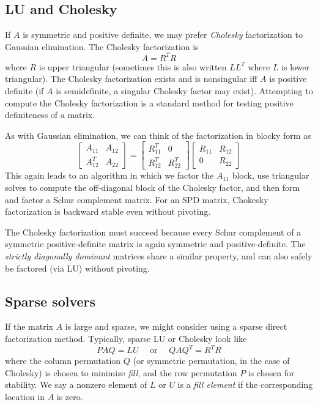 \documentclass[12pt, leqno]{article}
\begin{document}
\subsection{LU and Cholesky}

If $A$ is symmetric and positive definite, we may prefer {\em
  Cholesky} factorization to Gaussian elimination.  The Cholesky
factorization is
\[
  A = R^T R
\]
where $R$ is upper triangular (sometimes this is also written $LL^T$
where $L$ is lower triangular).  The Cholesky factorization exists
and is nonsingular iff $A$ is positive definite (if $A$ is
semidefinite, a singular Cholesky factor may exist).  Attempting
to compute the Cholesky factorization is a standard method for testing
positive definiteness of a matrix.

As with Gaussian elimination, we can think of the factorization in
blocky form as
\[
  \begin{bmatrix}
    A_{11} & A_{12} \\
    A_{12}^T & A_{22}
  \end{bmatrix} =
  \begin{bmatrix}
    R_{11}^T & 0 \\
    R_{12}^T & R_{22}^T
  \end{bmatrix}
  \begin{bmatrix}
    R_{11} & R_{12} \\
    0 & R_{22}
  \end{bmatrix}
\]
This again leads to an algorithm in which we factor the $A_{11}$
block, use triangular solves to compute the off-diagonal block of the
Cholesky factor, and then form and factor a Schur complement matrix.
For an SPD matrix, Chokesky factorization is backward stable even
without pivoting.

The Cholesky factorization must succeed because every Schur complement
of a symmetric positive-definite matrix is again symmetric and
positive-definite.  The {\em strictly diagonally dominant} matrices
share a similar property, and can also safely be factored (via LU)
without pivoting.

\subsection{Sparse solvers}

If the matrix $A$ is large and sparse, we might consider using a
sparse direct factorization method.  Typically, sparse LU or
Cholesky look like
\[
  PAQ = LU \quad \mbox{ or } \quad QAQ^T = R^T R
\]
where the column permutation $Q$ (or symmetric permutation, in
the case of Cholesky) is chosen to minimize {\em fill}, and
the row permutation $P$ is chosen for stability.  We say a nonzero
element of $L$ or $U$ is a {\em fill element} if the corresponding
location in $A$ is zero.
\end{document}
